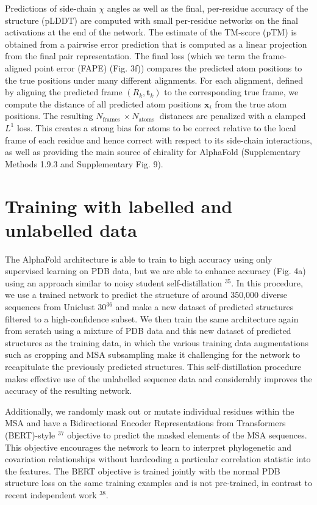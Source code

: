 \documentclass[10pt]{article}
\begin{document}
Predictions of side-chain $\chi$ angles as well as the final, per-residue accuracy of the structure (pLDDT) are computed with small per-residue networks on the final activations at the end of the network. The estimate of the TM-score (pTM) is obtained from a pairwise error prediction that is computed as a linear projection from the final pair representation. The final loss (which we term the frame-aligned point error (FAPE) (Fig. 3f)) compares the predicted atom positions to the true positions under many different alignments. For each alignment, defined by aligning the predicted frame $\left(R_{k}, \mathbf{t}_{k}\right)$ to the corresponding true frame, we compute the distance of all predicted atom positions $\mathbf{x}_{i}$ from the true atom positions. The resulting $N_{\text {frames }} \times N_{\text {atoms }}$ distances are penalized with a clamped $L^{1}$ loss. This creates a strong bias for atoms to be correct relative to the local frame of each residue and hence correct with respect to its side-chain interactions, as well as providing the main source of chirality for AlphaFold (Supplementary Methods 1.9.3 and Supplementary Fig. 9).

\section*{Training with labelled and unlabelled data}
The AlphaFold architecture is able to train to high accuracy using only supervised learning on PDB data, but we are able to enhance accuracy (Fig. 4a) using an approach similar to noisy student self-distillation ${ }^{35}$. In this procedure, we use a trained network to predict the structure of around 350,000 diverse sequences from Uniclust $30^{36}$ and make a new dataset of predicted structures filtered to a high-confidence subset. We then train the same architecture again from scratch using a mixture of PDB data and this new dataset of predicted structures as the training data, in which the various training data augmentations such as cropping and MSA subsampling make it challenging for the network to recapitulate the previously predicted structures. This self-distillation procedure makes effective use of the unlabelled sequence data and considerably improves the accuracy of the resulting network.

Additionally, we randomly mask out or mutate individual residues within the MSA and have a Bidirectional Encoder Representations from Transformers (BERT)-style ${ }^{37}$ objective to predict the masked elements of the MSA sequences. This objective encourages the network to learn to interpret phylogenetic and covariation relationships without hardcoding a particular correlation statistic into the features. The BERT objective is trained jointly with the normal PDB structure loss on the same training examples and is not pre-trained, in contrast to recent independent work ${ }^{38}$.
\end{document}
